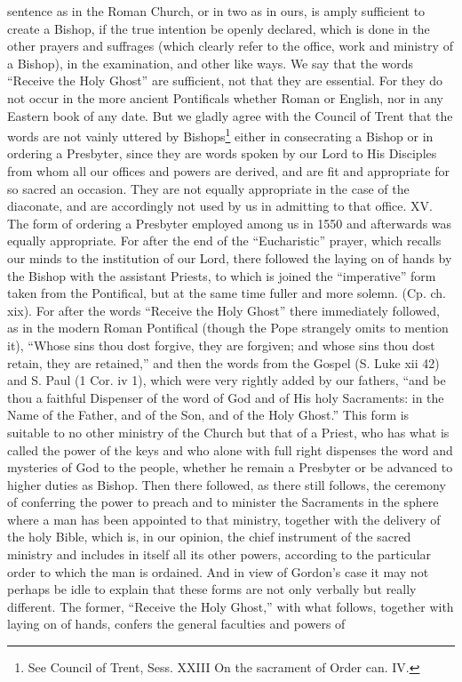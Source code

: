 sentence as in the Roman Church, or in two as in ours, is amply sufficient to create a Bishop, if the true intention be openly declared, which is done in the other prayers and suffrages (which clearly refer to the office, work and ministry of a Bishop), in the examination, and other like ways. We say that the words “Receive the Holy Ghost” are sufficient, not that they are essential. For they do not occur in the more ancient Pontificals whether Roman or English, nor in any Eastern book of any date. But we gladly agree with the Council of Trent that the words are not vainly uttered by Bishops\footnote{See Council of Trent, Sess. XXIII On the sacrament of Order can. IV.} either in consecrating a Bishop or in ordering a Presbyter, since they are words spoken by our Lord to His Disciples from whom all our offices and powers are derived, and are fit and appropriate for so sacred an occasion. They are not equally appropriate in the case of the diaconate, and are accordingly not used by us in admitting to that office. XV. The form of ordering a Presbyter employed among us in 1550 and afterwards was equally appropriate. For after the end of the “Eucharistic” prayer, which recalls our minds to the institution of our Lord, there followed the laying on of hands by the Bishop with the assistant Priests, to which is joined the “imperative” form taken from the Pontifical, but at the same time fuller and more solemn. (Cp. ch. xix). For after the words “Receive the Holy Ghost” there immediately followed, as in the modern Roman Pontifical (though the Pope strangely omits to mention it), “Whose sins thou dost forgive, they are forgiven; and whose sins thou dost retain, they are retained,” and then the words from the Gospel (S. Luke xii 42) and S. Paul (1 Cor. iv 1), which were very rightly added by our fathers, “and be thou a faithful Dispenser of the word of God and of His holy Sacraments: in the Name of the Father, and of the Son, and of the Holy Ghost.” This form is suitable to no other ministry of the Church but that of a Priest, who has what is called the power of the keys and who alone with full right dispenses the word and mysteries of God to the people, whether he remain a Presbyter or be advanced to higher duties as Bishop. Then there followed, as there still follows, the ceremony of conferring the power to preach and to minister the Sacraments in the sphere where a man has been appointed to that ministry, together with the delivery of the holy Bible, which is, in our opinion, the chief instrument of the sacred ministry and includes in itself all its other powers, according to the particular order to which the man is ordained. And in view of Gordon’s case it may not perhaps be idle to explain that these forms are not only verbally but really different. The former, “Receive the Holy Ghost,” with what follows, together with laying on of hands, confers the general faculties and powers of

